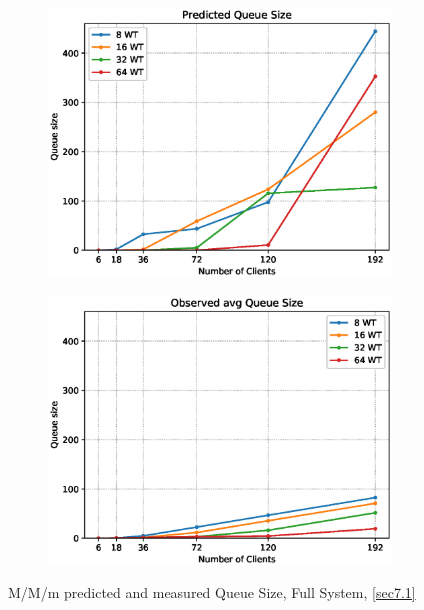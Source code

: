 \documentclass[11pt,a4paper]{article}
\begin{document}
\begin{figure}
    \begin{subfigure}{.5\textwidth}
        \includegraphics[width=1\linewidth]{plots/7_MMm_QueueSizePred.eps}
    \end{subfigure}
    \begin{subfigure}{.5\textwidth}
        \includegraphics[width=1\linewidth]{plots/7_MMm_QueueSizeObserved.eps}
    \end{subfigure}
    \caption{M/M/m predicted and measured Queue Size, Full System, \autoref{sec7.1}}
    \label{fig:mmm-queueLen}
\end{figure}
\end{document}
